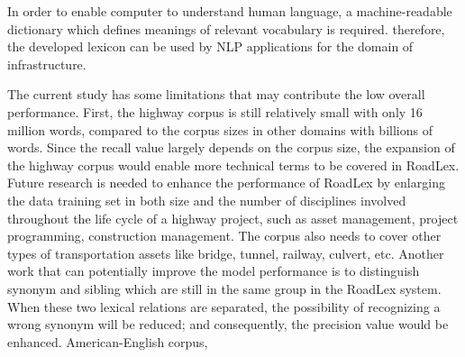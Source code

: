 \documentclass[Journal, BackFigs, DoubleSpace]{ascelike}%
\begin{document}
In order to enable computer to understand human language, a machine-readable dictionary which defines meanings of relevant vocabulary is required. therefore, the developed lexicon can be used by NLP applications for the domain of infrastructure. 
\par
%
The current study has some limitations that may contribute the low overall performance. First, the highway corpus is still relatively small with only 16 million words, compared to the corpus sizes in other domains with billions of words. Since the recall value largely depends on the corpus size, the expansion of the highway corpus would enable more technical terms to be covered in RoadLex. Future research is needed to enhance the performance of RoadLex by enlarging the data training set in both size and the number of disciplines involved throughout the life cycle of a highway project, such as asset management, project programming, construction management. The corpus also needs to cover other types of transportation assets like bridge, tunnel, railway, culvert, etc. Another work that can potentially improve the model performance is to distinguish synonym and sibling which are still in the same group in the RoadLex system. When these two lexical relations are separated, the possibility of recognizing a wrong synonym will be reduced; and consequently, the precision value would be enhanced.
%
American-English corpus, 
\end{document}
